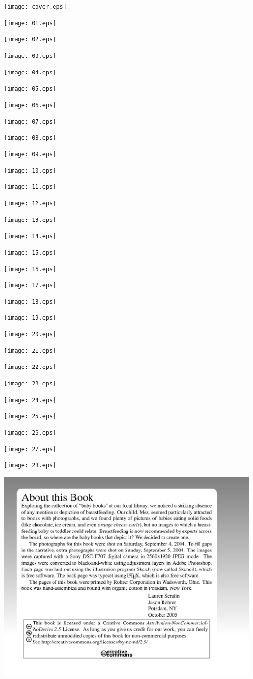 \documentclass[12pt]{article}
\begin{document}
\noindent\texttt{[image: cover.eps]}

\noindent\texttt{[image: 01.eps]}

\noindent\texttt{[image: 02.eps]}

\noindent\texttt{[image: 03.eps]}

\noindent\texttt{[image: 04.eps]}

\noindent\texttt{[image: 05.eps]}

\noindent\texttt{[image: 06.eps]}

\noindent\texttt{[image: 07.eps]}

\noindent\texttt{[image: 08.eps]}

\noindent\texttt{[image: 09.eps]}

\noindent\texttt{[image: 10.eps]}

\noindent\texttt{[image: 11.eps]}

\noindent\texttt{[image: 12.eps]}

\noindent\texttt{[image: 13.eps]}

\noindent\texttt{[image: 14.eps]}

\noindent\texttt{[image: 15.eps]}

\noindent\texttt{[image: 16.eps]}

\noindent\texttt{[image: 17.eps]}

\noindent\texttt{[image: 18.eps]}

\noindent\texttt{[image: 19.eps]}

\noindent\texttt{[image: 20.eps]}

\noindent\texttt{[image: 21.eps]}

\noindent\texttt{[image: 22.eps]}

\noindent\texttt{[image: 23.eps]}

\noindent\texttt{[image: 24.eps]}

\noindent\texttt{[image: 25.eps]}

\noindent\texttt{[image: 26.eps]}

\noindent\texttt{[image: 27.eps]}

\noindent\texttt{[image: 28.eps]}

\noindent\includegraphics[width=\textwidth]{back_cover.eps}
\end{document}
